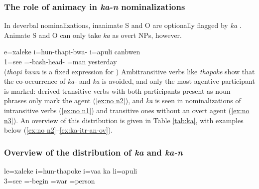
\subsubsection{The role of animacy in \textit{ka-n} nominalizations}
In deverbal nominalizations, inanimate S and O are optionally flagged by \textit{ka} . Animate S and O can only take \textit{ka} as overt NPs, however.

\ea \label{ex:ka overt}
\gll e=xaleke i=hun-thapi-bwa- i=apuli canbwen	\\
 1=see =-bash-head- =man yesterday	\\
\glt {} (\textit{thapi bwan} is a fixed expression for )
\z
Ambitransitive verbs like \textit{thapoke}  show that the co\hyp occurrence of \textit{ka-}  and \textit{ka}  is avoided, and only the most agentive participant is marked: derived transitive verbs with both participants present as noun phrases only mark the agent (\ref{ex:no n2}), and \textit{ka}  is seen in nominalizations of intransitive verbs (\ref{ex:no n1}) and transitive ones without an overt agent (\ref{ex:no n3}). An overview of this distribution is given in Table \ref{tab:ka}, with examples below (\ref{ex:no n2}--\ref{ex:ka-itr-an-ov}).

\subsubsection{Overview of the distribution of \textit{ka} and \textit{ka-n}}


\ea\label{ex:no n2}
\gll	le=xaleke i=hun-thapoke i=vaa ka li=apuli\\
	3=see =-begin =war  =person\\
\glt	{}
\z

